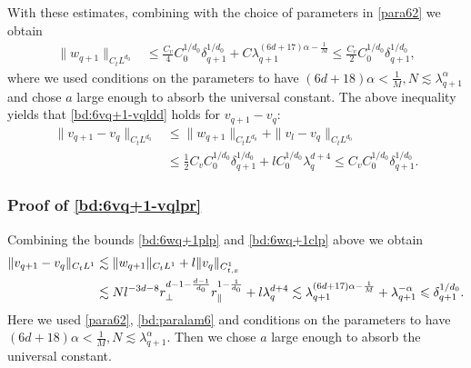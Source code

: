 \documentclass[10pt,a4paper]{amsart}
\numberwithin{equation}{section}
\def\leq{\leqslant}
\def\leq{\leqslant}
\begin{document}
With these estimates, combining with the choice of parameters in  \eqref{para62}  we obtain 
\begin{align}
\|w_{q+1}\|_{C_tL^{d_0}}%
&\leq \frac{C_v}4C_0^{1/d_0}\delta_{q+1}^{1/d_0}+C\lambda_{q+1}^{(6d+17)\alpha-\frac1M} \leq \frac{C_v}2C_0^{1/d_0}\delta_{q+1}^{1/d_0},\label{bd:6wq+1l2}\end{align}
where we used  conditions on the parameters to have
${(6d+18)\alpha<\frac{1}{M}},N \lesssim\lambda_{q+1}^{\alpha}$ and chose $a$ large enough to absorb the universal constant. 
The above inequality   yields that \eqref{bd:6vq+1-vqldd} holds for $v_{q+1}-v_q$:
\begin{align*}
\|v_{q+1}-v_{q}\|_{C_tL^{d_0}}&\leq\|w_{q+1} \|_{C_tL^{d_0}}+\|v_{l}-v_{q}\|_{C_tL^{d_0}}\\
&\leq \frac12
C_vC_0^{1/d_0}\delta_{q+1}^{1/d_0}+lC_0^{1/d_0}\lambda_q^{d+4} \leq
C_vC_0^{1/d_0}\delta_{q+1}^{1/d_0}.
\end{align*}

\subsubsection{Proof of  \eqref{bd:6vq+1-vqlpr}}

Combining  the bounds  \eqref{bd:6wq+1plp} and \eqref{bd:6wq+1clp} above we obtain 
\begin{align*}
 \|v_{q+1}-v_q\|_{C_tL^{1}}&\lesssim  \|w_{q+1}\|_{C_tL^{1}} +l\|v_q\|_{C_{t,x}^1}\notag \\
&\lesssim  N l^{-3d-8}r_\perp^{d-1-\frac{d-1}{d_0}} r_\parallel^{1-\frac{1}{d_0}}+l \lambda_q^{d+4}\lesssim \lambda_{q+1}^{(6d+17)\alpha-\frac1M}+\lambda_{q+1}^{-\alpha}
\leq\delta_{q+1}^{1/d_0}. 
\end{align*}
  Here we used \eqref{para62}, \eqref{bd:paralam6} and  conditions on the parameters to have 
${(6d+18)\alpha<\frac{1}{M}},N \lesssim\lambda_{q+1}^{\alpha}$. Then we chose $a$ large enough to absorb the universal constant. 
\end{document}
